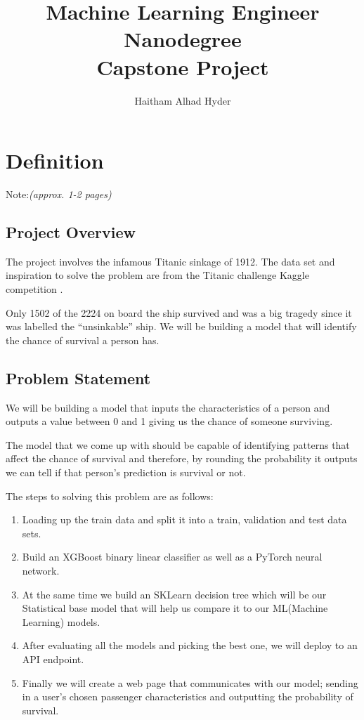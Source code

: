 \documentclass{article}
\title{Machine Learning Engineer Nanodegree \\
\large Capstone Project}
\author{Haitham Alhad Hyder}
\begin{document}
\maketitle

\section{Definition}\label{definition}

Note:\emph{(approx. 1-2 pages)}

\subsection*{Project Overview}\label{project-overview}

The project involves the infamous Titanic sinkage of 1912. The data set
and inspiration to solve the problem are from the Titanic challenge
Kaggle competition \parencite{kaggle}.

Only 1502 of the 2224 on board the ship survived and was a big tragedy
since it was labelled the ``unsinkable'' ship. We will be building a
model that will identify the chance of survival a person has.

\subsection{Problem Statement}\label{problem-statement}

We will be building a model that inputs the characteristics of a person
and outputs a value between 0 and 1 giving us the chance of someone
surviving.

The model that we come up with should be capable of identifying patterns
that affect the chance of survival and therefore, by rounding the
probability it outputs we can tell if that person's prediction is
survival or not.

The steps to solving this problem are as follows:

\begin{enumerate}
\item
  Loading up the train data and split it into a train, validation and
  test data sets.
\item
  Build an XGBoost binary linear classifier as well as a PyTorch neural
  network.
\item
  At the same time we build an SKLearn decision tree which will be our
  Statistical base model that will help us compare it to our ML(Machine
  Learning) models.
\item
  After evaluating all the models and picking the best one, we will
  deploy to an API endpoint.
\item
  Finally we will create a web page that communicates with our model;
  sending in a user's chosen passenger characteristics and outputting
  the probability of survival.
\end{enumerate}
\end{document}
